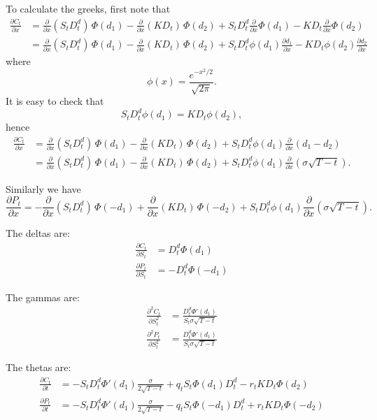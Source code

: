 To calculate the greeks, first note that
\begin{align*}
  \frac{\partial C_t}{\partial x} 
    &= \frac{\partial}{\partial x} (S_t D_t^d)\, \Phi(d_1)   
      - \frac{\partial}{\partial x} (K D_t)\, \Phi(d_2)   
      + S_t D_t^d \frac{\partial}{\partial x} \Phi(d_1)   
      - K D_t \frac{\partial}{\partial x} \Phi(d_2) \\
    &= \frac{\partial}{\partial x} (S_t D_t^d)\, \Phi(d_1)   
      - \frac{\partial}{\partial x} (K D_t)\, \Phi(d_2)   
      + S_t D_t^d \phi(d_1) \frac{\partial d_1}{\partial x} 
      - K D_t \phi(d_2) \frac{\partial d_2}{\partial x} 
\end{align*}
where
\[
  \phi(x)=\frac{e^{-x^2/2}}{\sqrt{2\pi}}.
\]
It is easy to check that 
\[
  S_t D_t^d \phi(d_1) = K D_t \phi(d_2),
\]
hence
\begin{align*}
  \frac{\partial C_t}{\partial x} 
    &= \frac{\partial}{\partial x} (S_t D_t^d)\, \Phi(d_1)   
      - \frac{\partial}{\partial x} (K D_t)\, \Phi(d_2)   
      + S_t D_t^d \phi(d_1) \frac{\partial}{\partial x} (d_1-d_2) \\
    &= \frac{\partial}{\partial x} (S_t D_t^d)\, \Phi(d_1)   
      - \frac{\partial}{\partial x} (K D_t)\, \Phi(d_2)   
      + S_t D_t^d \phi(d_1) \frac{\partial}{\partial x} (\sigma\sqrt{T-t}).
\end{align*}

Similarly we have
\[
  \frac{\partial P_t}{\partial x} 
    = -\frac{\partial}{\partial x} (S_t D_t^d)\, \Phi(-d_1)   
      + \frac{\partial}{\partial x} (K D_t)\, \Phi(-d_2)   
      + S_t D_t^d \phi(d_1) \frac{\partial}{\partial x} (\sigma\sqrt{T-t}).
\]

The deltas are: 
\begin{align}
	\frac{\partial C_t}{\partial S_t} &= D_t^d \Phi(d_1)   \\
	\frac{\partial P_t}{\partial S_t} &= - D_t^d \Phi(-d_1)
\end{align}

The gammas are:
\begin{align}
  \frac{\partial^2 C_t}{\partial S_t^2} 
	  &= \frac{D_t^d \Phi'(d_1)}{S_t \sigma \sqrt{T-t}}  \\
  \frac{\partial^2 P_t}{\partial S_t^2} 
    &= \frac{D_t^d \Phi'(d_1)}{S_t \sigma \sqrt{T-t}}
\end{align}

The thetas are:
\begin{align}
	\frac{\partial C_t}{\partial t} 
	  &= - S_t  D_t^d \Phi'(d_1) \frac{\sigma}{2\sqrt{T-t}} + q_t S_t \Phi(d_1) D_t^d 
  	   - r_t K D_t \Phi(d_2)    \\
	\frac{\partial P_t}{\partial t} 
	  &= - S_t  D_t^d \Phi'(d_1) \frac{\sigma}{2\sqrt{T-t}} - q_t S_t \Phi(-d_1) D_t^d 
  	   + r_t K D_t \Phi(-d_2)  
\end{align}

